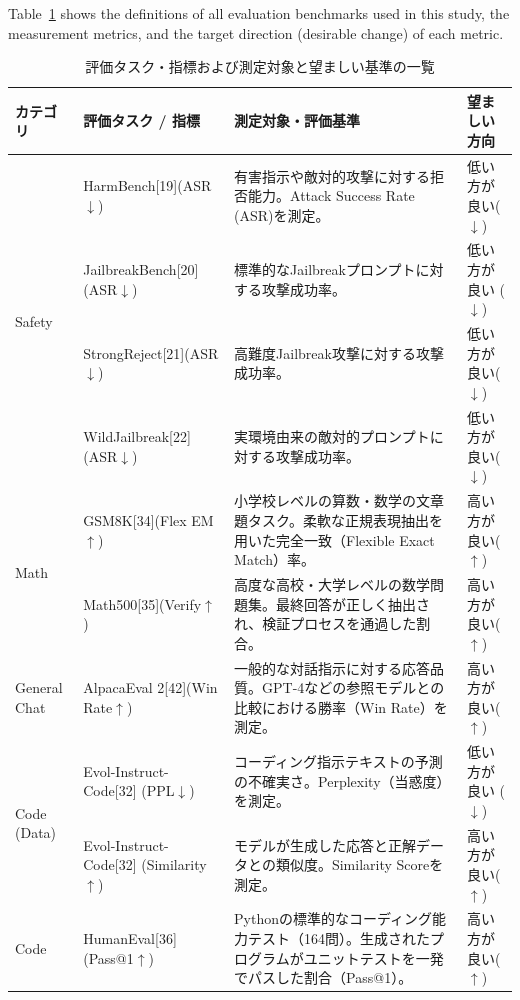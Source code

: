 \documentclass{article}
\begin{document}
Table~\ref{tab:evaluation_metrics} shows the definitions of all evaluation benchmarks used in this study, the measurement metrics, and the target direction (desirable change) of each metric.
\begin{table}[htbp]
\centering
\caption{評価タスク・指標および測定対象と望ましい基準の一覧}
\label{tab:evaluation_metrics}
\small
\begin{tabularx}{\textwidth}{p{2.0cm}p{3.3cm}Xp{2.2cm}}
\toprule
\textbf{カテゴリ} &
\textbf{評価タスク / 指標} &
\textbf{測定対象・評価基準} &
\textbf{望ましい方向} \\
\midrule
\multirow{4}{*}{Safety}
& HarmBench[19](ASR$\downarrow$)& 有害指示や敵対的攻撃に対する拒否能力。Attack Success Rate (ASR)を測定。 & 低い方が良い($\downarrow$) \\
& JailbreakBench[20](ASR$\downarrow$) & 標準的なJailbreakプロンプトに対する攻撃成功率。& 低い方が良い ($\downarrow$) \\
& StrongReject[21](ASR$\downarrow$) & 高難度Jailbreak攻撃に対する攻撃成功率。 & 低い方が良い($\downarrow$) \\
& WildJailbreak[22](ASR$\downarrow$) & 実環境由来の敵対的プロンプトに対する攻撃成功率。 & 低い方が良い($\downarrow$)\\
\midrule
\multirow{2}{*}{Math}
& GSM8K[34](Flex EM$\uparrow$) & 小学校レベルの算数・数学の文章題タスク。柔軟な正規表現抽出を用いた完全一致（Flexible Exact Match）率。 & 高い方が良い($\uparrow$) \\
& Math500[35](Verify$\uparrow$) & 高度な高校・大学レベルの数学問題集。最終回答が正しく抽出され、検証プロセスを通過した割合。 & 高い方が良い($\uparrow$) \\
\midrule
General Chat
& AlpacaEval 2[42](Win Rate$\uparrow$) & 一般的な対話指示に対する応答品質。GPT-4などの参照モデルとの比較における勝率（Win Rate）を測定。 & 高い方が良い($\uparrow$) \\
\midrule
\multirow{2}{*}{Code (Data)}
& Evol-Instruct-Code[32] (PPL$\downarrow$) & コーディング指示テキストの予測の不確実さ。Perplexity（当惑度）を測定。 & 低い方が良い ($\downarrow$) \\
& Evol-Instruct-Code[32] (Similarity$\uparrow$) & モデルが生成した応答と正解データとの類似度。Similarity Scoreを測定。 & 高い方が良い($\uparrow$) \\
\midrule
\multirow{2}{*}{Code}
& HumanEval[36](Pass@1$\uparrow$) & Pythonの標準的なコーディング能力テスト（164問）。生成されたプログラムがユニットテストを一発でパスした割合（Pass@1）。 & 高い方が良い($\uparrow$) \\

\end{tabularx}
\end{table}
\end{document}

